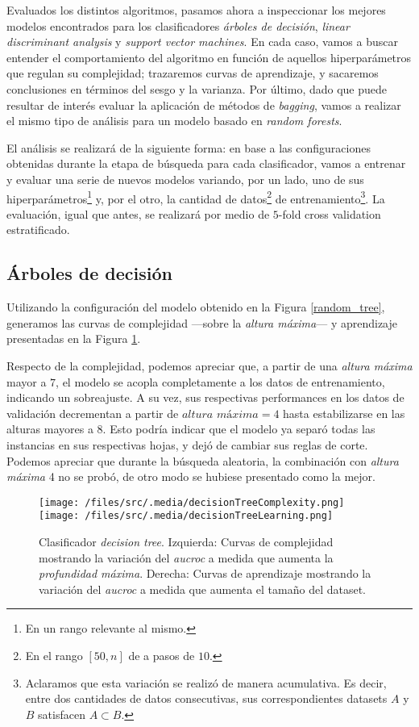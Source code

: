 Evaluados los distintos algoritmos, pasamos ahora a inspeccionar los mejores modelos encontrados para los clasificadores \textit{árboles de decisión}, \textit{linear discriminant analysis} y \textit{support vector machines}. En cada caso, vamos a buscar entender el comportamiento del algoritmo en función de aquellos hiperparámetros que regulan su complejidad; trazaremos curvas de aprendizaje, y sacaremos conclusiones en términos del sesgo y la varianza. Por último, dado que puede resultar de interés evaluar la aplicación de métodos de \textit{bagging}, vamos a realizar el mismo tipo de análisis para un modelo basado en \textit{random forests}.

El análisis se realizará de la siguiente forma: en base a las configuraciones obtenidas durante la etapa de búsqueda para cada clasificador, vamos a entrenar y evaluar una serie de nuevos modelos variando, por un lado, uno de sus hiperparámetros\footnote{En un rango relevante al mismo.} y, por el otro, la cantidad de datos\footnote{En el rango $[50, n]$ de a pasos de $10$.} de entrenamiento\footnote{Aclaramos que esta variación se realizó de manera acumulativa. Es decir, entre dos cantidades de datos consecutivas, sus correspondientes datasets $A$ y $B$ satisfacen $A \subset B$.}. La evaluación, igual que antes, se realizará por medio de $5$-fold cross validation estratificado.

\subsection{Árboles de decisión}
Utilizando la configuración del modelo obtenido en la Figura \ref{random_tree}, generamos las curvas de complejidad ---sobre la \textit{altura máxima}--- y aprendizaje presentadas en la Figura \ref{decisionTreeComplexity}.  

Respecto de la complejidad, podemos apreciar que, a partir de una \textit{altura máxima} mayor a $7$, el modelo se acopla completamente a los datos de entrenamiento, indicando un sobreajuste. A su vez, sus respectivas performances en los datos de validación decrementan a partir de $\textit{altura máxima} = 4$ hasta estabilizarse en las alturas mayores a $8$. Esto podría indicar que el modelo ya separó todas las instancias en sus respectivas hojas, y dejó de cambiar sus reglas de corte. 
Podemos apreciar que durante la búsqueda aleatoria, la combinación con \textit{altura máxima} 4 no se probó, de otro modo se hubiese presentado como la mejor.

\vspace{0.5em}
\begin{figure}[!htbp] 
    \centering
    \texttt{[image: /files/src/.media/decisionTreeComplexity.png]}
    \texttt{[image: /files/src/.media/decisionTreeLearning.png]}
    \caption{Clasificador \textit{decision tree}. Izquierda: Curvas de complejidad mostrando la variación del \textit{aucroc} a medida que aumenta la \textit{profundidad máxima}. Derecha: Curvas de aprendizaje mostrando la variación del \textit{aucroc} a medida que aumenta el tamaño del dataset.}
    \label{decisionTreeComplexity}
\end{figure}

